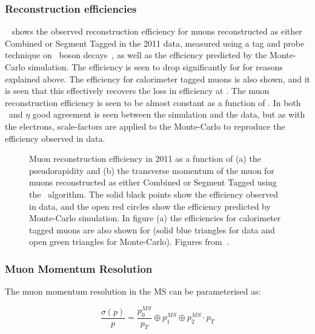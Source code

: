 \subsubsection{Reconstruction efficiencies}

~ shows the observed reconstruction efficiency for muons
reconstructed as either Combined or Segment
Tagged in the 2011 data, measured using
a tag and probe technique on \Z\ boson decays~\cite{ATLAS-CONF-2011-063}, as well as the efficiency predicted by the
Monte-Carlo simulation. The efficiency is
seen to drop significantly for  for reasons explained above. The
efficiency for calorimeter tagged muons is also shown, and it is seen that this
effectively recovers the loss in efficiency at . The muon
reconstruction efficiency is seen to be almost constant as a function of \pt. In
both \pt\ and $\eta$ good agreement is seen between the simulation and the data,
but as with the electrons, scale-factors are applied to the Monte-Carlo to
reproduce the efficiency observed in data.

\begin{figure}[h]
\centering
\caption{Muon reconstruction efficiency in 2011 as a function of (a) the pseudorapidity
and (b) the transverse momentum of the muon for muons reconstructed as either Combined or Segment
Tagged using the \staco\ algorithm. The solid black points
show the efficiency observed in data, and the open red circles show the
efficiency predicted by Monte-Carlo simulation. In figure (a) the efficiencies for
calorimeter tagged muons are also shown for  (solid blue triangles
for data and open green triangles for Monte-Carlo). Figures from~\cite{MuonEfficiency2011}.}
\label{fig:mu-reco-eff}
\end{figure}


\subsubsection{Muon Momentum Resolution}

The muon momentum resolution in the MS can be parameterised as:

\begin{equation}
\frac{ \sigma (p) }{ p } = \frac{ p_{0}^{MS} }{ p_{T} } \oplus  p_{1}^{MS}
\oplus  p_{2}^{MS} \cdot p_{T}
\end{equation}

